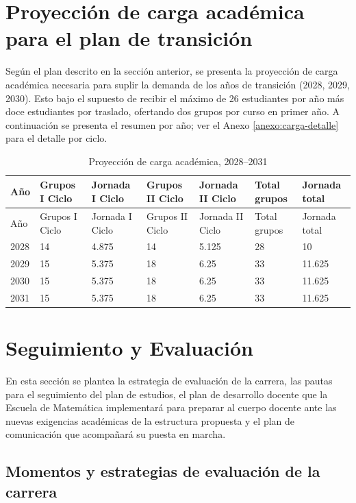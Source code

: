 \section{Proyección de carga académica para el plan de transición}
\label{sec:carga}

Según el plan descrito en la sección anterior, se presenta la proyección de carga académica necesaria para suplir la demanda de los años de transición (2028, 2029, 2030). Esto bajo el supuesto de recibir el máximo de 26 estudiantes por año más doce estudiantes por traslado, ofertando dos grupos por curso en primer año. A continuación se presenta el resumen por año; ver el Anexo \ref{anexo:carga-detalle} para el detalle por ciclo.

\begin{longtable}[c]{|p{1.2cm}|p{2cm}|p{2.1cm}|p{2cm}|p{2.1cm}|p{1.9cm}|p{2cm}|}
\caption{Proyección de carga académica, 2028--2031}
\label{tab:cargaresumen}\\
\hline
\rowcolor[HTML]{00C0F3}
Año & Grupos I Ciclo & Jornada I Ciclo & Grupos II Ciclo & Jornada II Ciclo & Total grupos & Jornada total \\ \hline
\endfirsthead
\hline
\rowcolor[HTML]{00C0F3}
Año & Grupos I Ciclo & Jornada I Ciclo & Grupos II Ciclo & Jornada II Ciclo & Total grupos & Jornada total \\ \hline
\endhead
%
2028 & 14 & 4.875 & 14 & 5.125 & 28 & 10 \\ \hline
2029 & 15 & 5.375 & 18 & 6.25 & 33 & 11.625 \\ \hline
2030 & 15 & 5.375 & 18 & 6.25 & 33 & 11.625 \\ \hline
2031 & 15 & 5.375 & 18 & 6.25 & 33 & 11.625 \\ \hline
\end{longtable}

\section{Seguimiento y Evaluación}

En esta sección se plantea la estrategia de evaluación de la carrera, las pautas para el seguimiento del plan de estudios, el plan de desarrollo docente que la Escuela de Matemática implementará para preparar al cuerpo docente ante las nuevas exigencias académicas de la estructura propuesta y el plan de comunicación que acompañará su puesta en marcha.

\subsection{Momentos y estrategias de evaluación de la carrera}

